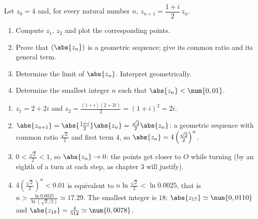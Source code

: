 \begin{exercise}
Let $z_0=4$ and, for every natural number $n$, $z_{n+1}=\dfrac{1+i}2\,z_n$.
\begin{enumerate}
\item Compute $z_1$, $z_2$ and plot the corresponding points.
\item Prove that $\left(\abs{z_n}\right)$ is a geometric sequence; give its common ratio and its general term.
\item Determine the limit of $\abs{z_n}$. Interpret geometrically.
\item Determine the smallest integer $n$ such that $\abs{z_n}<\num{0,01}$.
\end{enumerate}
\end{exercise}
\begin{solution}
\begin{enumerate}
\item $z_1=2+2i$ and $z_2=\frac{(1+i)(2+2i)}2=(1+i)^2=2i$.
\item $\abs{z_{n+1}}=\abs{\frac{1+i}2}\abs{z_n}=\frac{\sqrt2}2\abs{z_n}$: a geometric sequence with common ratio $\frac{\sqrt2}2$ and first term $4$, so $\abs{z_n}=4\left(\frac{\sqrt2}2\right)^n$.
\item $0<\frac{\sqrt2}2<1$, so $\abs{z_n}\to0$: the points get closer to $O$ while turning (by an eighth of a turn at each step, as chapter 3 will justify).
\item $4\left(\frac{\sqrt2}2\right)^n<\num{0,01}$ is equivalent to $n\ln\frac{\sqrt2}2<\ln\num{0,0025}$, that is $n>\frac{\ln \num{0,0025}}{\ln(\sqrt2/2)}\simeq\num{17,29}$. The smallest integer is $18$: $\abs{z_{17}}\simeq\num{0,0110}$ and $\abs{z_{18}}=\frac{4}{512}\simeq\num{0,0078}$.
\end{enumerate}
\end{solution}

\mxnewpage
